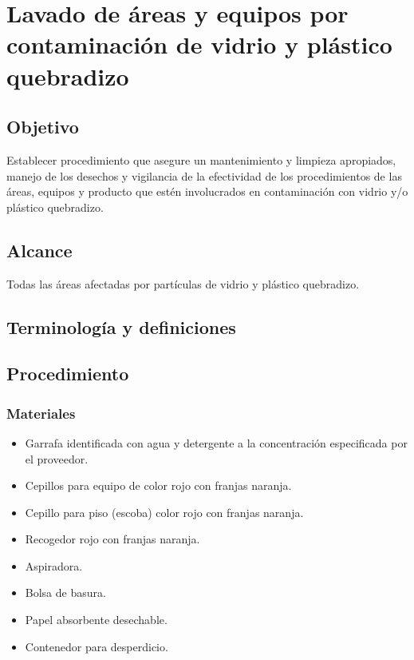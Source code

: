 \thispagestyle{formato-PI}
\renewcommand{\MayorVer}{2}
\renewcommand{\MenorVer}{0}
\renewcommand{\Titulo}{Lavado de áreas y equipos por contaminación de vidrio y plástico quebradizo}
\renewcommand{\TipoID}{IT}
\renewcommand{\FechaPub}{2023--01}

\section{\Titulo}
\renewcommand{\Codigo}{\Prog--\thesection--\TipoID}

\subsection{Objetivo}
Establecer procedimiento que asegure un mantenimiento y limpieza apropiados, manejo de los desechos y vigilancia de la efectividad de los procedimientos de las áreas, equipos y producto que estén involucrados en contaminación con vidrio y/o plástico quebradizo.

\subsection{Alcance}
Todas las áreas afectadas por partículas de vidrio y plástico quebradizo.

\subsection{Terminología y definiciones}
\begin{description}
\end{description}

\subsection{Procedimiento}

\subsubsection{Materiales}

\begin{itemize}
	\item Garrafa identificada con agua y detergente a la concentración especificada por el proveedor.
	\item Cepillos para equipo de color rojo con franjas naranja.
	\item Cepillo para piso (escoba) color rojo con franjas naranja.
	\item Recogedor rojo con franjas naranja.
	\item Aspiradora.
	\item Bolsa de basura.
	\item Papel absorbente desechable.
	\item Contenedor para desperdicio.
\end{itemize}

